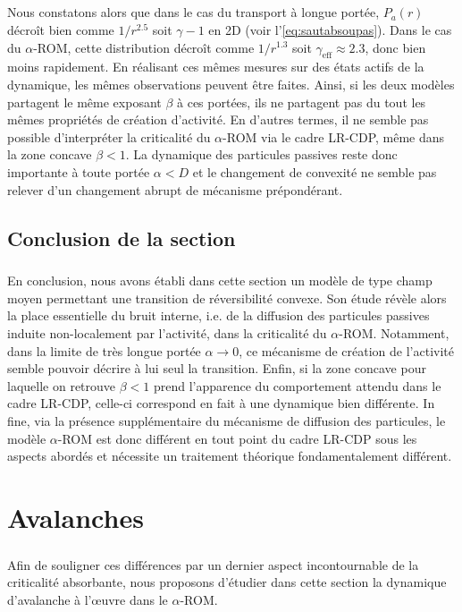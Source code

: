 \subparagraph{}Nous constatons alors que dans le cas du transport à longue portée, $P_a(r)$ décroît bien comme $1/r^{2.5}$ soit $\gamma - 1$ en 2D (voir l'\autoref{eq:sautabsoupas}). Dans le cas du $\alpha$-ROM, cette distribution décroît comme $1/r^{1.3}$ soit $\gamma_\text{eff}\approx 2.3$, donc bien moins rapidement. En réalisant ces mêmes mesures sur des états actifs de la dynamique, les mêmes observations peuvent être faites. Ainsi, si les deux modèles partagent le même exposant $\beta$ à ces portées, ils ne partagent pas du tout les mêmes propriétés de création d'activité. En d'autres termes, il ne semble pas possible d'interpréter la criticalité du $\alpha$-ROM via le cadre LR-CDP, même dans la zone concave $\beta < 1$. La dynamique des particules passives reste donc importante à toute portée $\alpha < D$ et le changement de convexité ne semble pas relever d'un changement abrupt de mécanisme prépondérant.

\subsection{Conclusion de la section}

\subparagraph{}En conclusion, nous avons établi dans cette section un modèle de type champ moyen permettant une transition de réversibilité convexe. Son étude révèle alors la place essentielle du bruit interne, i.e. de la diffusion des particules passives induite non-localement par l'activité, dans la criticalité du $\alpha$-ROM. Notamment, dans la limite de très longue portée $\alpha\rightarrow 0$, ce mécanisme de création de l'activité semble pouvoir décrire à lui seul la transition. Enfin, si la zone concave pour laquelle on retrouve $\beta<1$ prend l'apparence du comportement attendu dans le cadre LR-CDP, celle-ci correspond en fait à une dynamique bien différente. In fine, via la présence supplémentaire du mécanisme de diffusion des particules, le modèle $\alpha$-ROM est donc différent en tout point du cadre LR-CDP sous les aspects abordés et nécessite un traitement théorique fondamentalement différent.

\section{Avalanches}

\subparagraph{}Afin de souligner ces différences par un dernier aspect incontournable de la criticalité absorbante, nous proposons d'étudier dans cette section la dynamique d'avalanche à l’œuvre dans le $\alpha$-ROM.

